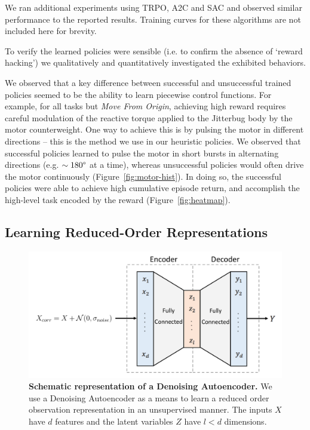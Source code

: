 \documentclass[letterpaper, 10 pt, conference]{ieeeconf}
\begin{document}
We ran additional experiments using TRPO, A2C and SAC and observed similar performance to the reported results.
Training curves for these algorithms are not included here for brevity.

To verify the learned policies were sensible (i.e. to confirm the absence of `reward hacking') we qualitatively and quantitatively investigated the exhibited behaviors.

We observed that a key difference between successful and unsuccessful trained policies seemed to be the ability to learn piecewise control functions.
For example, for all tasks but \emph{Move From Origin}, achieving high reward requires careful modulation of the reactive torque applied to the Jitterbug body by the motor counterweight.
One way to achieve this is by pulsing the motor in different directions -- this is the method we use in our heuristic policies.
We observed that successful policies learned to pulse the motor in short bursts in alternating directions (e.g. $\sim180\degree$ at a time), whereas unsuccessful policies would often drive the motor continuously (Figure~\ref{fig:motor-hist}).
In doing so, the successful policies were able to achieve high cumulative episode return, and accomplish the high-level task encoded by the reward (Figure~\ref{fig:heatmap}).

\subsection{Learning Reduced-Order Representations}\label{sec:lro}

\begin{figure}[t]
    \centering
    \includegraphics[width=\linewidth]{fig-autoencoder}
    \caption{
        \textbf{Schematic representation of a Denoising Autoencoder.}
        We use a Denoising Autoencoder as a means to learn a reduced order observation representation in an unsupervised manner. The inputs $X$ have $d$ features and the latent variables $Z$ have $l<d$ dimensions.
    }
    \label{fig:autoencoder}
\end{figure}
\end{document}
